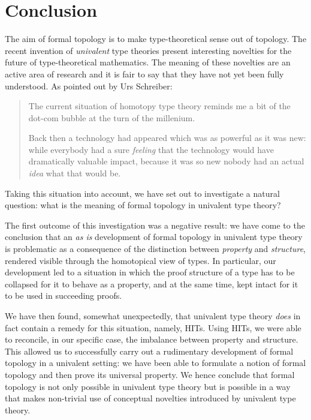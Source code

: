 \chapter{Conclusion}\label{chap:conc}


The aim of formal topology is to make type-theoretical sense out of topology. The recent
invention of \emph{univalent} type theories present interesting novelties for the future
of type-theoretical mathematics. The meaning of these novelties are an active area of
research and it is fair to say that they have not yet been fully understood. As pointed
out by Urs Schreiber:
\begin{quote}
  The current situation of homotopy type theory reminds me a bit of the dot-com bubble
  at the turn of the millenium.

  Back then a technology had appeared which was as powerful as it was new: while everybody
  had a sure \emph{feeling} that the technology would have dramatically valuable impact,
  because it was so new nobody had an actual \emph{idea} what that would be.
\end{quote}
Taking this situation into account, we have set out to investigate a natural question:
what is the meaning of formal topology in univalent type theory?

The first outcome of this investigation was a negative result: we have come to the
conclusion that an \emph{as is} development of formal topology in univalent type theory is
problematic as a consequence of the distinction between \emph{property} and
\emph{structure}, rendered visible through the homotopical view of types. In particular,
our development led to a situation in which the proof structure of a type has to be
collapsed for it to behave as a property, and at the same time, kept intact for it to be
used in succeeding proofs.

We have then found, somewhat unexpectedly, that univalent type theory \emph{does} in fact
contain a remedy for this situation, namely, HITs. Using HITs, we were able to reconcile,
in our specific case, the imbalance between property and structure. This allowed us to
successfully carry out a rudimentary development of formal topology in a univalent
setting: we have been able to formulate a notion of formal topology and then prove its
universal property. We hence conclude that formal topology is not only possible in
univalent type theory but is possible in a way that makes non-trivial use of conceptual
novelties introduced by univalent type theory.

